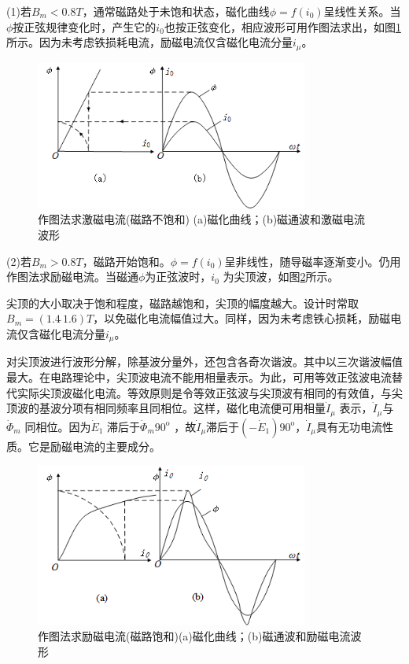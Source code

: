\documentclass{book}
\begin{document}
(1)若${{B}_{m}}<0.8T$，通常磁路处于未饱和状态，磁化曲线$\phi =f\left( {{i}_{0}} \right)$呈线性关系。当$\phi $按正弦规律变化时，产生它的${{i}_{0}}$也按正弦变化，相应波形可用作图法求出，如图\ref{fig_3.4}所示。因为未考虑铁损耗电流，励磁电流仅含磁化电流分量${{i}_{\mu }}$。
\begin{figure}[H]
	\centering
	\includegraphics[width=0.80\textwidth]{3-4g.png}
	\caption{作图法求激磁电流(磁路不饱和)
		(a)磁化曲线；(b)磁通波和激磁电流波形}
	\label{fig_3.4}
\end{figure}
(2)若${{B}_{m}}>0.8T$，磁路开始饱和。$\phi  = f\left( {{i_0}}\right)$呈非线性，随导磁率逐渐变小。仍用作图法求励磁电流。当磁通$\phi$为正弦波时，${{i}_{0}}$ 为尖顶波，如图\ref{fig_3.5}所示。

尖顶的大小取决于饱和程度，磁路越饱和，尖顶的幅度越大。设计时常取${{B}_{m}}=\left( 1.4\tilde{\ }1.6 \right)T$，以免磁化电流幅值过大。同样，因为未考虑铁心损耗，励磁电流仅含磁化电流分量${{i}_{\mu }}$。

对尖顶波进行波形分解，除基波分量外，还包含各奇次谐波。其中以三次谐波幅值最大。在电路理论中，尖顶波电流不能用相量表示。为此，可用等效正弦波电流替代实际尖顶波磁化电流。等效原则是令等效正弦波与尖顶波有相同的有效值，与尖顶波的基波分项有相同频率且同相位。这样，磁化电流便可用相量${{\dot{I}}_{\mu }}$ 表示，${{\dot{I}}_{\mu }}$与${{\dot{\Phi }}_{m}}$ 同相位。因为${{\dot{E}}_{1}}$ 滞后于${{\dot{\Phi }}_{m}}$${{90}^{\text{o}}}$ ，故${{\dot{I}}_{\mu }}$滞后于$\left( -{{{\dot{E}}}_{1}} \right){{90}^{\text{o}}}$，${{\dot{I}}_{\mu }}$具有无功电流性质。它是励磁电流的主要成分。
\begin{figure}[H]
	\centering
	\includegraphics[width=0.80\textwidth]{3-5g.png}
	\caption{作图法求励磁电流(磁路饱和)(a)磁化曲线；(b)磁通波和励磁电流波形}
	\label{fig_3.5}
\end{figure}
\end{document}

